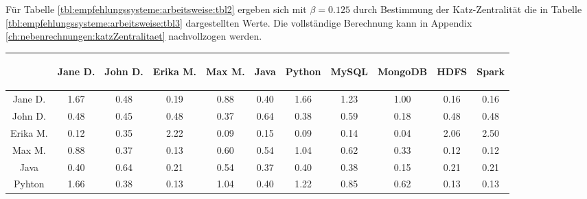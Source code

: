 
Für Tabelle \ref{tbl:empfehlungssysteme:arbeitsweise:tbl2} ergeben sich mit $\beta = 0.125$ durch Bestimmung der Katz-Zentralität die in Tabelle \ref{tbl:empfehlungssysteme:arbeitsweise:tbl3} dargestellten Werte. Die vollständige Berechnung kann in Appendix \ref{ch:nebenrechnungen:katzZentralitaet} nachvollzogen werden.
\begin{table}[h]
	\centering
	\begin{tabular}{c|c|c|c|c|c|c|c|c|c|c}
		& \begin{sideways}Jane D.\end{sideways} & \begin{sideways}John D.\end{sideways} & \begin{sideways}Erika M.\end{sideways} & \begin{sideways}Max M.\end{sideways} & \begin{sideways}Java\end{sideways} & \begin{sideways}Python\end{sideways} & \begin{sideways}MySQL\end{sideways} & \begin{sideways}MongoDB\end{sideways} & \begin{sideways}HDFS\end{sideways} & \begin{sideways}Spark\end{sideways} \\ 
		\hline
		Jane D.  & 1.67 & 0.48 & 0.19 & 0.88 & 0.40 & 1.66 & 1.23 & 1.00 & 0.16 & 0.16\\
		John D.  & 0.48 & 0.45 & 0.48 & 0.37 & 0.64 & 0.38 & 0.59 & 0.18 & 0.48 & 0.48\\
		Erika M. & 0.12 & 0.35 & 2.22 & 0.09 & 0.15 & 0.09 & 0.14 & 0.04 & 2.06 & 2.50\\
		Max M.   & 0.88 & 0.37 & 0.13 & 0.60 & 0.54 & 1.04 & 0.62 & 0.33 & 0.12 & 0.12\\
		Java     & 0.40 & 0.64 & 0.21 & 0.54 & 0.37 & 0.40 & 0.38 & 0.15 & 0.21 & 0.21\\
		Pyhton   & 1.66 & 0.38 & 0.13 & 1.04 & 0.40 & 1.22 & 0.85 & 0.62 & 0.13 & 0.13\\

\end{tabular}
\end{table}
